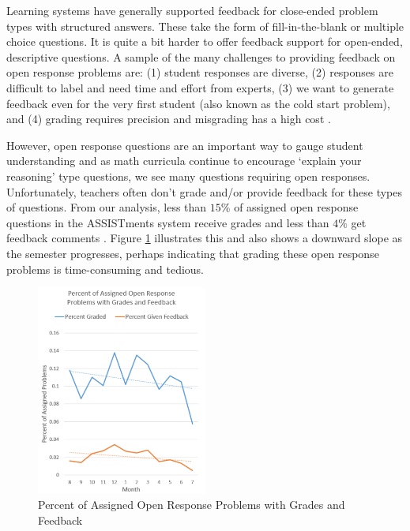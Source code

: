 \documentclass[12pt]{report}
\begin{document}
Learning systems have generally supported feedback for close-ended problem types with structured answers. These take the form of fill-in-the-blank or multiple choice questions. It is quite a bit harder to offer feedback support for open-ended, descriptive questions. A sample of the many challenges to providing feedback on open response problems are: (1) student responses are diverse, (2) responses are difficult to label and need time and effort from experts, (3) we want to generate feedback even for the very first student (also known as the cold start problem), and (4) grading requires precision and misgrading has a high cost \cite{malik2021generative}.

However, open response questions are an important way to gauge student understanding and as math curricula continue to encourage `explain your reasoning' type questions, we see many questions requiring open responses. Unfortunately, teachers often don't grade and/or provide feedback for these types of questions. From our analysis, less than $15\%$ of assigned open response questions in the ASSISTments system receive grades and less than $4\%$ get feedback comments \cite{graded_openresponses}. Figure \ref{img:graded_openresponse} illustrates this and also shows a downward slope as the semester progresses, perhaps indicating that grading these open response problems is time-consuming and tedious.

\begin{figure}[ht] 
    \centering
    \includegraphics[width=0.5\textwidth]{images/graded_openresponse.png}
    \caption{Percent of Assigned Open Response Problems with Grades and Feedback}
    \label{img:graded_openresponse}
\end{figure}
\end{document}
